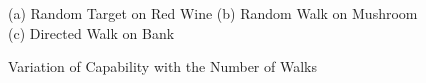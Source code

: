 \documentclass[preprint,1p,authoryear,times]{elsarticle}
\begin{document}
\begin{figure}[h]
	\scriptsize{(a) Random Target on Red Wine \hspace{1cm} (b) Random Walk on Mushroom \hspace{1cm} 
(c) Directed Walk on Bank} 
	\caption{Variation of Capability with the Number of Walks}
	\label{fig:CaseStudyCapabilityVariation}
\end{figure}

\end{document}

